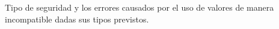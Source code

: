 Tipo de seguridad y los errores causados ​​por el uso de valores de manera incompatible dadas sus tipos previstos.